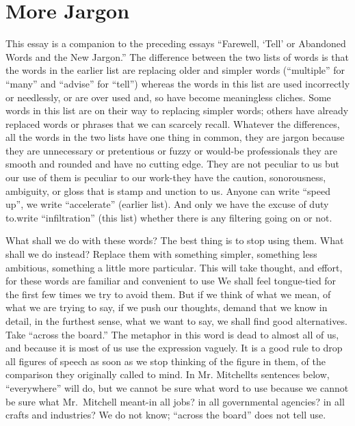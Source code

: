 \documentclass[
    oneside,
    11pt,
    draft
]{memoir}
\begin{document}
\chapter{More Jargon}
This essay is a companion to the preceding essays \enquote{Farewell, \enquote{Tell} or Abandoned Words and the New Jargon.} The difference between the two lists of words is that the words in the earlier list are replacing older and simpler words (\enquote{multiple} for \enquote{many} and \enquote{advise} for \enquote{tell}) whereas the words in this list are used incorrectly or needlessly, or are over used and, so have become meaningless cliches. Some words in this list are on their way to replacing simpler words; others have already replaced words or phrases that we can scarcely recall. Whatever the differences, all the words in the two lists have one thing in common, they are jargon because they are unnecessary or pretentious or fuzzy or would-be professionals they are smooth and rounded and have no cutting edge. They are not peculiar to us but our use of them is peculiar to our work-they have the caution, sonorousness, ambiguity, or gloss that is stamp and unction to us. Anyone can write \enquote{speed up}, we write \enquote{accelerate} (earlier list). And only we have the excuse of duty to.write \enquote{infiltration} (this list) whether there is any filtering going on or not.

What shall we do with these words? The best thing is to stop using them. What shall we do instead? Replace them with something simpler, something less ambitious, something a little more particular. This will take thought, and effort, for these words are familiar and convenient to use We shall feel tongue-tied for the first few times we try to avoid them. But if we think of what we mean, of what we are trying to say, if we push our thoughts, demand that we know in detail, in the furthest sense, what we want to say, we shall find good alternatives. Take \enquote{across the board.} The metaphor in this word is dead to almost all of us, and because it is most of us use the expression vaguely. It is a good rule to drop all figures of speech as soon as we stop thinking of the figure in them, of the comparison they originally called to mind. In Mr. Mitchellts sentences below, \enquote{everywhere} will do, but we cannot be sure what word to use because we cannot be sure what Mr.\ Mitchell meant-in all jobs? in all governmental agencies? in all crafts and industries? We do not know; \enquote{across the board} does not tell use.
\end{document}
